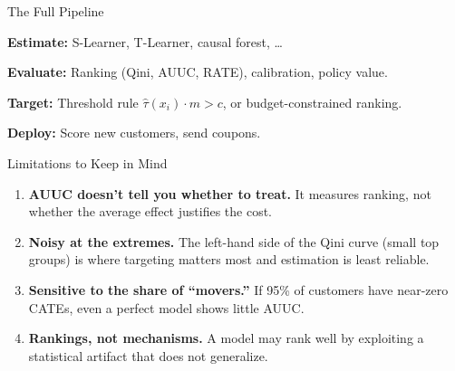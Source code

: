 \documentclass[aspectratio=169, 11pt]{beamer}
\begin{document}
\begin{frame}{The Full Pipeline}
 
\begin{center}
\end{center}
 
\bigskip
 
\textbf{Estimate:} S-Learner, T-Learner, causal forest, \ldots
 
\textbf{Evaluate:} Ranking (Qini, AUUC, RATE), calibration, policy value.
 
\textbf{Target:} Threshold rule $\hat{\tau}(x_i) \cdot m > c$, or budget-constrained ranking.
 
\textbf{Deploy:} Score new customers, send coupons.
\end{frame}
 
\begin{frame}{Limitations to Keep in Mind}
 
\begin{enumerate}
    \item \textbf{AUUC doesn't tell you whether to treat.} It measures ranking, not whether the average effect justifies the cost.
 
    \medskip
 
    \item \textbf{Noisy at the extremes.} The left-hand side of the Qini curve (small top groups) is where targeting matters most and estimation is least reliable.
 
    \medskip
 
    \item \textbf{Sensitive to the share of ``movers.''} If 95\% of customers have near-zero CATEs, even a perfect model shows little AUUC.
 
    \medskip
 
    \item \textbf{Rankings, not mechanisms.} A model may rank well by exploiting a statistical artifact that does not generalize.
\end{enumerate}
\end{frame}
 
\end{document}
